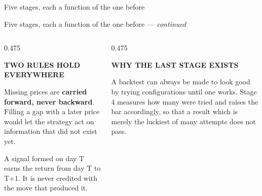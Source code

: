 \documentclass[aspectratio=169,10pt]{beamer}
\makeatletter
\newcommand{\eyebrow}[1]{\def\@eyebrow{#1}}
\newcommand{\bodytext}[1]{{\sffamily\fontsize{7.4}{9.7}\selectfont\color{ink2}#1\par}}
\newcommand{\subhead}[1]{{\sffamily\fontsize{6.6}{9}\selectfont\bfseries\color{ink2}%
  \MakeUppercase{#1}\par\vskip0.6mm}}
\newcommand{\str}[1]{{\color{ink}\bfseries #1}}
\makeatother
\begin{document}
\begin{frame}[t]{Five stages, each a function of the one before}
\begin{center}
\end{center}\vskip1mm
\end{frame}
\eyebrow{The system}
\begin{frame}[t]{Five stages, each a function of the one before \textnormal{\itshape --- continued}}
\begin{columns}[T]\begin{column}{0.475\textwidth}\subhead{Two rules hold everywhere}
\bodytext{Missing prices are \str{carried forward, never backward}. Filling a gap with a later price would let the strategy act on information that did not exist yet.}
\vskip0.8mm
\bodytext{A signal formed on day T earns the return from day T to T+1. It is never credited with the move that produced it.}
\vskip0.8mm\end{column}\begin{column}{0.475\textwidth}\subhead{Why the last stage exists}
\bodytext{A backtest can always be made to look good by trying configurations until one works. Stage 4 measures how many were tried and raises the bar accordingly, so that a result which is merely the luckiest of many attempts does not pass.}
\vskip0.8mm\end{column}\end{columns}
\end{frame}
\eyebrow{The system}
\end{document}
